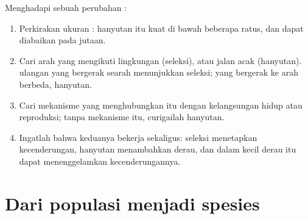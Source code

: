 \begin{method}\label{met:g12:selection-drift-speciation:which}
Menghadapi sebuah perubahan :
\begin{enumerate}
  \item Perkirakan ukuran : hanyutan itu kuat di bawah
        beberapa ratus, dan dapat diabaikan pada jutaan.
  \item Cari arah yang mengikuti lingkungan (seleksi), atau jalan acak
        (hanyutan).  ulangan yang bergerak searah menunjukkan
        seleksi; yang bergerak ke arah berbeda, hanyutan.
  \item Cari mekanisme yang menghubungkan  itu dengan kelangsungan
        hidup atau reproduksi; tanpa mekanisme itu, curigailah
        hanyutan.
  \item Ingatlah bahwa keduanya bekerja sekaligus: seleksi menetapkan
        kecenderungan, hanyutan menambahkan derau, dan dalam 
        kecil derau itu dapat menenggelamkan kecenderungannya.
\end{enumerate}
\end{method}

\section{Dari populasi menjadi spesies}

